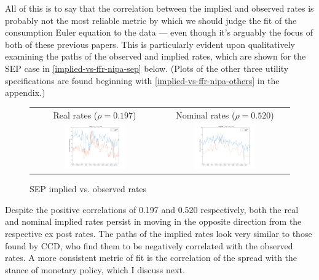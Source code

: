 All of this is to say that the correlation between the implied and observed rates is probably not the most reliable metric by which we should judge the fit of the consumption Euler equation to the data --- even though it's arguably the focus of both of these previous papers. This is particularly evident upon qualitatively examining the paths of the observed and implied rates, which are shown for the SEP case in \autoref{implied-vs-ffr-nipa-sep} below. (Plots of the other three utility specifications are found beginning with \autoref{implied-vs-ffr-nipa-others} in the appendix.)

\begin{figure}[h]
\centering
\begin{tabular}{cc} \\
Real rates ($\rho = 0.197$) & Nominal rates ($\rho = 0.520$) \\
\includegraphics[width=0.49\textwidth]{figs/nipa/implied-vs-ffr/real_sep} &
\includegraphics[width=0.49\textwidth]{figs/nipa/implied-vs-ffr/nominal_sep}
\end{tabular}
\caption{SEP implied vs. observed rates}
\label{implied-vs-ffr-nipa-sep}
\end{figure}

Despite the positive correlations of 0.197 and 0.520 respectively, both the real and nominal implied rates persist in moving in the opposite direction from the respective ex post rates. The paths of the implied rates look very similar to those found by CCD, who find them to be negatively correlated with the observed rates. A more consistent metric of fit is the correlation of the spread with the stance of monetary policy, which I discuss next.



